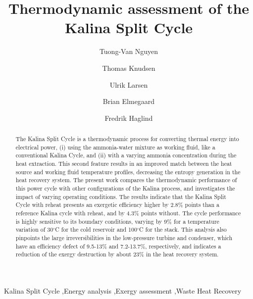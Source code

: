 \documentclass[final,times,5p]{elsarticle}
\begin{document}
\begin{frontmatter}

\title{Thermodynamic assessment of the Kalina Split Cycle}

\author[]{Tuong-Van Nguyen}  
\author[]{Thomas Knudsen} 
\author[]{Ulrik Larsen} 
\author[]{Brian Elmegaard} 
\author[]{Fredrik Haglind} 

\address{Section of Thermal Energy, Department of Mechanical Engineering, Technical University of Denmark,\\ Building 403, Nils Koppels All\'{e}, 2800 Kongens Lyngby, Denmark}

\begin{abstract}

The Kalina Split Cycle is a thermodynamic process for converting thermal energy into electrical power, (i) using the ammonia-water mixture as working fluid, like a conventional Kalina Cycle, and (ii) with a varying ammonia concentration during the heat extraction. This second feature results in an improved match between the heat source and working fluid temperature profiles, decreasing the entropy generation in the heat recovery system.  
The present work compares the thermodynamic performance of this power cycle with other configurations of the Kalina process, and investigates the impact of varying operating conditions. The results indicate that the Kalina Split Cycle with reheat presents an exergetic efficiency higher by 2.8\% points than a reference Kalina cycle with reheat, and by 4.3\% points without. The cycle performance is highly sensitive to its boundary conditions, varying by 9\% for a temperature variation of 30$^{\circ}$C for the cold reservoir and 100$^{\circ}$C for the stack. This analysis also pinpoints the large irreversibilities in the low-pressure turbine and condenser, which have an efficiency defect of 9.5-13\% and 7.2-13.7\%, respectively, and indicates a reduction of the exergy destruction by about 23\% in the heat recovery system. 

\end{abstract}

\begin{keyword}
Kalina Split Cycle \sep Energy analysis \sep Exergy assessment \sep Waste Heat Recovery 
\end{keyword}

\end{frontmatter}

%
\linenumbers
\end{document}
